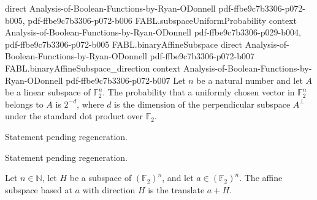 \begin{theorem}
  {direct}
  {Analysis-of-Boolean-Functions-by-Ryan-ODonnell}
  {pdf-ffbe9c7b3306-p072-b005,
    pdf-ffbe9c7b3306-p072-b006}
\proofstep
  {FABL.subspaceUniformProbability}
  {context}
  {Analysis-of-Boolean-Functions-by-Ryan-ODonnell}
  {pdf-ffbe9c7b3306-p029-b004,
    pdf-ffbe9c7b3306-p072-b005}
\proofstep
  {FABL.binaryAffineSubspace}
  {direct}
  {Analysis-of-Boolean-Functions-by-Ryan-ODonnell}
  {pdf-ffbe9c7b3306-p072-b007}
\proofstep
  {FABL.binaryAffineSubspace_direction}
  {context}
  {Analysis-of-Boolean-Functions-by-Ryan-ODonnell}
  {pdf-ffbe9c7b3306-p072-b007}
Let $n$ be a natural number and let $A$ be a linear subspace of $\mathbb{F}_2^n$. The
probability that a uniformly chosen vector in $\mathbb{F}_2^n$ belongs to $A$ is
$2^{-d}$, where $d$ is the dimension of the perpendicular subspace $A^\perp$ under the
standard dot product over $\mathbb{F}_2$.
\end{theorem}

\begin{theorem}
\label{FABL.subsetDensity_submodule_apply}
\leanok
{}
Statement pending regeneration.
\end{theorem}

\begin{theorem}
\label{FABL.subsetDensity_submodule_fourier_expansion}
\leanok
{}
Statement pending regeneration.
\end{theorem}

\begin{definition}
\label{FABL.binaryAffineSubspace}
\leanok
{}
Let $n\in\mathbb{N}$, let $H$ be a subspace of $(\mathbb{F}_2)^n$, and let
$a\in(\mathbb{F}_2)^n$. The affine subspace based at $a$ with direction $H$ is the
translate $a+H$.
\end{definition}

